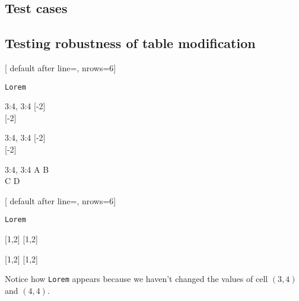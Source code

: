 \documentclass{l3doc}
\begin{document}
\begin{documentation}
\section{Test cases}

\subsection*{Testing robustness of table modification}

\begin{tablesample}
[
    default after line=\hline, 
    nrows=6]
\begin{lptfill}{}
\verb|Lorem|
\end{lptfill}
\begin{lptview}{3:4, 3:4}
{  }[-2]\\
{  }[-2]
\end{lptview}
\LPTUseTable\par\vspace*{1em}
\begin{lptview}{3:4, 3:4}
{  }[-2]\\
{  }[-2]
\end{lptview}
\LPTUseTable\par\vspace*{1em}
\begin{lptview}{3:4, 3:4}
{A} {B}\\
{C} {D}
\end{lptview}
\LPTUseTable
\end{tablesample}


\begin{tablesample}
[
    default after line=\hline, 
    nrows=6]
\begin{lptfill}{}
\verb|Lorem|
\end{lptfill}
[1,2]{}
[1,2]{}
\LPTUseTable\par\vspace*{1em}
[1,2]{}
[1,2]{}
\LPTUseTable\par\vspace*{1em}
Notice how \verb|Lorem| appears because we haven't changed
the values of cell $(3,4)$ and $(4,4)$.\par
{}
\LPTUseTable\par\vspace*{1em}
\end{tablesample}


\end{documentation}
\end{document}
